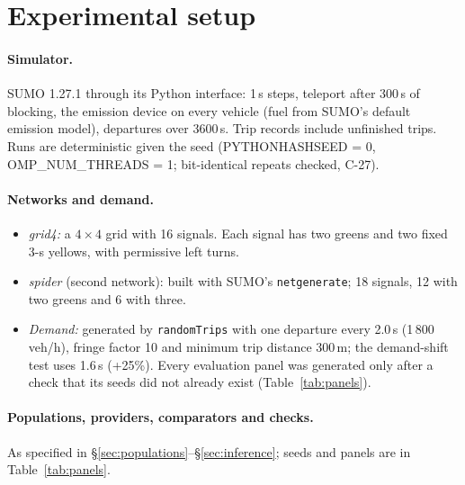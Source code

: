\documentclass[11pt]{article}
\begin{document}
\section{Experimental setup}\label{sec:setup}
\paragraph{Simulator.} SUMO 1.27.1 \cite{lopez2018} through its Python interface: 1\,s steps, teleport after 300\,s of blocking, the
emission device on every vehicle (fuel from SUMO's default emission model), departures over 3600\,s. Trip records include unfinished trips.
Runs are deterministic given the seed (PYTHONHASHSEED = 0, OMP\_NUM\_THREADS = 1; bit-identical repeats checked, C-27).
\paragraph{Networks and demand.}
\begin{itemize}\setlength\itemsep{0pt}
\item \emph{grid4:} a $4\times4$ grid with 16 signals. Each signal has two greens and two fixed 3-s yellows, with permissive left turns.
\item \emph{spider} (second network): built with SUMO's \texttt{netgenerate}; 18 signals, 12 with two greens and 6 with three.
\item \emph{Demand:} generated by \texttt{randomTrips} with one departure every 2.0\,s (1\,800\,veh/h), fringe factor 10 and minimum trip
distance 300\,m; the demand-shift test uses 1.6\,s (+25\%). Every evaluation panel was generated only after a check that its seeds did not
already exist (Table~\ref{tab:panels}).
\end{itemize}
\paragraph{Populations, providers, comparators and checks.} As specified in §\ref{sec:populations}--§\ref{sec:inference}; seeds and
panels are in Table~\ref{tab:panels}.
\end{document}
